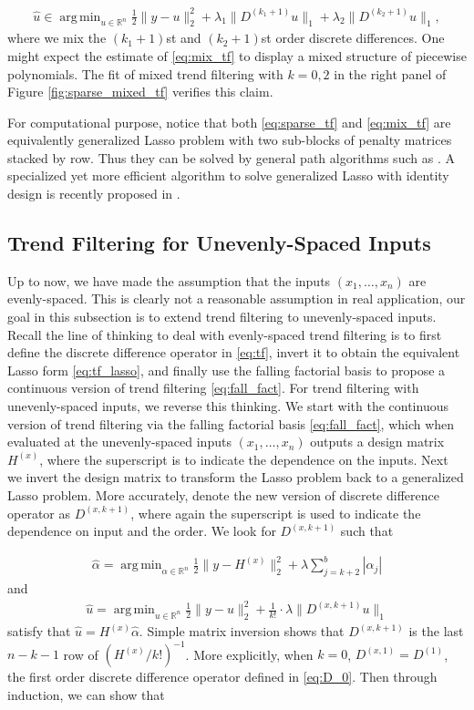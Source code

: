 \documentclass[a4paper]{article}
\DeclareMathOperator*{\argmin}{arg\,min}
\newcommand{\RR}{\mathbb{R}}
\begin{document}
\begin{align}
\hat{u} \in \argmin_{u\in\RR^n}\frac{1}{2}\|y-u\|_2^2 + \lambda_1\|D^{(k_1+1)}u\|_1 + \lambda_2\|D^{(k_2+1)}u\|_1,
\label{eq:mix_tf}
\end{align}
where we mix the $(k_1+1)$st and $(k_2+1)$st order discrete differences. One might expect the estimate of \eqref{eq:mix_tf} to display a mixed structure of piecewise polynomials. The fit of mixed trend filtering with $k=0,2$ in the right panel of Figure \ref{fig:sparse_mixed_tf} verifies this claim. 

For computational purpose, notice that both \eqref{eq:sparse_tf} and \eqref{eq:mix_tf} are equivalently generalized Lasso problem with two sub-blocks of penalty matrices stacked by row. Thus they can be solved by general path algorithms such as \cite{tibshirani2011solution,arnold2016efficient}. A specialized yet more efficient algorithm to solve generalized Lasso with identity design is recently proposed in \cite{ramdas2016fast}.

\subsection{Trend Filtering for Unevenly-Spaced Inputs}
\label{subsec:uneven}
Up to now, we have made the assumption that the inputs $(x_1,\ldots, x_n)$ are evenly-spaced. This is clearly not a reasonable assumption in real application, our goal in this subsection is to extend trend filtering to unevenly-spaced inputs. Recall the line of thinking to deal with evenly-spaced trend filtering is to first define the discrete difference operator in \eqref{eq:tf}, invert it to obtain the equivalent Lasso form \eqref{eq:tf_lasso}, and finally use the falling factorial basis to propose a continuous version of trend filtering \eqref{eq:fall_fact}. For trend filtering with unevenly-spaced inputs, we reverse this thinking. We start with the continuous version of trend filtering via the falling factorial basis \eqref{eq:fall_fact}, which when evaluated at the unevenly-spaced inputs $(x_1,\ldots, x_n)$ outputs a design matrix $H^{(x)}$, where the superscript is to indicate the dependence on the inputs. Next we invert the design matrix to transform the Lasso problem back to a generalized Lasso problem. More accurately, denote the new version of discrete difference operator as $D^{(x,k+1)}$, where again the superscript is used to indicate the dependence on input and the order. We look for $D^{(x,k+1)}$ such that

\begin{align*}
\hat{\alpha} = \argmin_{\alpha\in\RR^n} \frac{1}{2}\|y-H^{(x)}\|_2^2 + \lambda\sum_{j=k+2}^b|\alpha_j|
\end{align*}
and 
\begin{align*}
\hat{u} = \argmin_{u\in\RR^n} \frac{1}{2}\|y-u\|_2^2 + \frac{1}{k!}\cdot\lambda\|D^{(x,k+1)}u\|_1
\end{align*}
satisfy that $\hat{u} = H^{(x)}\hat{\alpha}$. Simple matrix inversion shows that $D^{(x,k+1)}$ is the last $n-k-1$ row of $(H^{(x)}/k!)^{-1}$. More explicitly, when $k = 0$, $D^{(x,1)} = D^{(1)}$, the first order discrete difference operator defined in \eqref{eq:D_0}. Then through induction, we can show that
\end{document}
